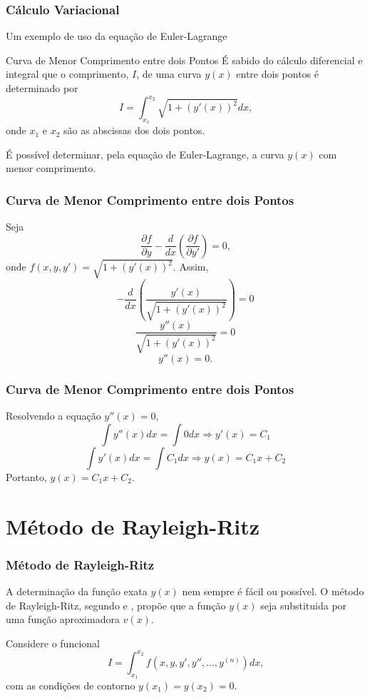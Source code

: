 \documentclass{beamer}
\begin{document}
	\begin{frame}
		\frametitle{Cálculo Variacional}
		\justify
		
		Um exemplo de uso da equação de Euler-Lagrange
		\pause
		\begin{block}{Curva de Menor Comprimento entre dois Pontos}
			É sabido do cálculo diferencial e integral que o comprimento, $I$, de uma curva $y(x)$ entre dois pontos é determinado por
			$$
				I=\int_{x_1}^{x_2} \sqrt{1+(y'(x))^2} dx
				\text{,}
			$$
			onde $x_1$ e $x_2$ são as abscissas dos dois pontos.
			
			É possível determinar, pela equação de Euler-Lagrange, a curva $y(x)$ com menor comprimento.
		\end{block}
	\end{frame}
	
	\begin{frame}
		\frametitle{Curva de Menor Comprimento entre dois Pontos}
		\justify
		
		Seja
		$$
			\frac{\partial f}{\partial y}
			-
			\frac{d}{dx} \left (
				\frac{\partial f}{\partial y'}
			\right )
			= 0
			\text{,}
		$$
		onde $f(x, y, y')=\sqrt{1+(y'(x))^2}$. \pause Assim,
		$$
			-\frac{d}{dx} \left (
				\frac{y'(x)}{\sqrt{1+(y'(x))^2}}
			\right )
			= 0
		$$
		\pause
		$$
			\frac{y''(x)}{
				\sqrt{1+(y'(x))^2}
			}
			= 0
		$$
		\pause
		$$
			y''(x)=0
			\text{.}
		$$
	\end{frame}
	
	\begin{frame}
		\frametitle{Curva de Menor Comprimento entre dois Pontos}
		\justify
		
		Resolvendo a equação $y''(x)=0$\pause ,
		$$
			\int y''(x)dx = \int 0 dx \Longrightarrow y'(x) = C_1
		$$
		\pause
		$$
			\int y'(x)dx = \int C_1 dx \Longrightarrow y(x) = C_1 x + C_2
		$$
		\pause
		Portanto, $y(x)=C_1 x + C_2$.
	\end{frame}
	
	
	\section{Método de Rayleigh-Ritz}
	\makesubtitleframe{Método de Rayleigh-Ritz}
	
	\begin{frame}
		\frametitle{Método de Rayleigh-Ritz}
		\justify
		
		A determinação da função exata $y(x)$ nem sempre é fácil ou possível. O método de Rayleigh-Ritz, segundo \cite{mefassan} e \cite{MRR_Deflex}, propõe que a função $y(x)$ seja substituida por uma função aproximadora $v(x)$.
		\vspace{10pt}
		\pause
		
		Considere o funcional
		$$
			I = \int_{x_1}^{x_2} f(x, y, y', y'', \dots, y^{(n)})dx\text{,}
		$$
		com as condições de contorno $y(x_1)=y(x_2)=0$.
	\end{frame}
	
\end{document}
